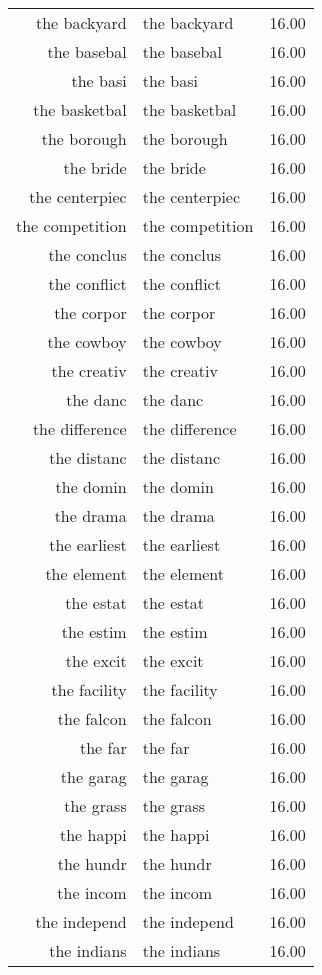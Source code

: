 \begin{table}[ht]
\begin{tabular}{rlr}
  the backyard & the backyard & 16.00 \\ 
  the basebal & the basebal & 16.00 \\ 
  the basi & the basi & 16.00 \\ 
  the basketbal & the basketbal & 16.00 \\ 
  the borough & the borough & 16.00 \\ 
  the bride & the bride & 16.00 \\ 
  the centerpiec & the centerpiec & 16.00 \\ 
  the competition & the competition & 16.00 \\ 
  the conclus & the conclus & 16.00 \\ 
  the conflict & the conflict & 16.00 \\ 
  the corpor & the corpor & 16.00 \\ 
  the cowboy & the cowboy & 16.00 \\ 
  the creativ & the creativ & 16.00 \\ 
  the danc & the danc & 16.00 \\ 
  the difference & the difference & 16.00 \\ 
  the distanc & the distanc & 16.00 \\ 
  the domin & the domin & 16.00 \\ 
  the drama & the drama & 16.00 \\ 
  the earliest & the earliest & 16.00 \\ 
  the element & the element & 16.00 \\ 
  the estat & the estat & 16.00 \\ 
  the estim & the estim & 16.00 \\ 
  the excit & the excit & 16.00 \\ 
  the facility & the facility & 16.00 \\ 
  the falcon & the falcon & 16.00 \\ 
  the far & the far & 16.00 \\ 
  the garag & the garag & 16.00 \\ 
  the grass & the grass & 16.00 \\ 
  the happi & the happi & 16.00 \\ 
  the hundr & the hundr & 16.00 \\ 
  the incom & the incom & 16.00 \\ 
  the independ & the independ & 16.00 \\ 
  the indians & the indians & 16.00 \\ 

\end{tabular}
\end{table}
